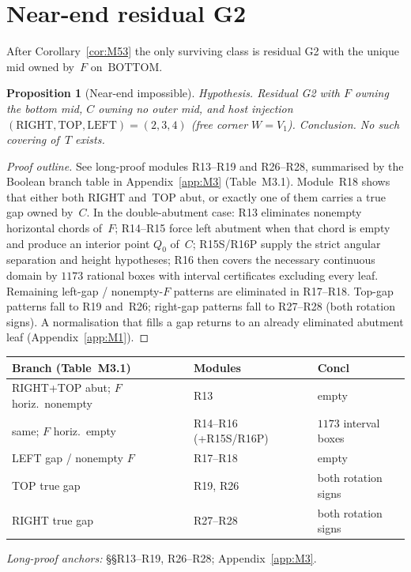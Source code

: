 \documentclass[11pt,reqno]{amsart}
\newtheorem{proposition}[theorem]{Proposition}
\theoremstyle{definition}
\newcommand{\BOTTOM}{\mathrm{BOTTOM}}
\newcommand{\RIGHT}{\mathrm{RIGHT}}
\newcommand{\TOP}{\mathrm{TOP}}
\newcommand{\LEFT}{\mathrm{LEFT}}
\begin{document}
\section{Near-end residual G2}\label{sec:near}

After Corollary~\ref{cor:M53} the only surviving class is residual G2 with the
unique mid owned by~$F$ on~$\BOTTOM$.

\begin{proposition}[Near-end impossible]\label{prop:M61}
\emph{Hypothesis.} Residual G2 with $F$ owning the bottom mid, $C$ owning no
outer mid, and host injection $(\RIGHT,\TOP,\LEFT)=(2,3,4)$ (free corner
$W=V_1$).
\emph{Conclusion.} No such covering of~$T$ exists.
\end{proposition}

\begin{proof}[Proof outline]
See long-proof modules R13--R19 and R26--R28, summarised by the Boolean
branch table in Appendix~\ref{app:M3} (Table~M3.1).  Module~R18 shows that
either both $\RIGHT$ and~$\TOP$ abut, or exactly one of them carries a true
gap owned by~$C$.  In the double-abutment case: R13 eliminates nonempty
horizontal chords of~$F$; R14--R15 force left abutment when that chord is
empty and produce an interior point $Q_0$ of~$C$; R15S/R16P supply the
strict angular separation and height hypotheses; R16 then covers the
necessary continuous domain by $1173$ rational boxes with interval
certificates excluding every leaf.  Remaining left-gap / nonempty-$F$
patterns are eliminated in R17--R18.  Top-gap patterns fall to R19 and~R26;
right-gap patterns fall to R27--R28 (both rotation signs).  A normalisation
that fills a gap returns to an already eliminated abutment leaf
(Appendix~\ref{app:M1}).
\end{proof}

\begin{center}
\small
\begin{tabular}{@{}llp{}@{}}
\toprule
Branch (Table~M3.1) & Modules & Concl \\
\midrule
RIGHT+TOP abut; $F$ horiz.\ nonempty & R13 & empty \\
same; $F$ horiz.\ empty & R14--R16 (+R15S/R16P) & $1173$ interval boxes \\
LEFT gap / nonempty $F$ & R17--R18 & empty \\
TOP true gap & R19, R26 & both rotation signs \\
RIGHT true gap & R27--R28 & both rotation signs \\
\bottomrule
\end{tabular}
\end{center}
\smallskip
\noindent\textit{Long-proof anchors:} §§R13--R19, R26--R28; Appendix~\ref{app:M3}.
\end{document}
